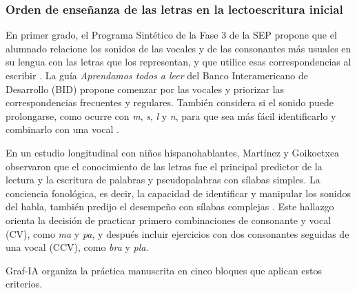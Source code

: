 \subsubsection{Orden de enseñanza de las letras en la lectoescritura inicial}
\label{sec:orden-ensenanza-letras}

En primer grado, el Programa Sintético de la Fase 3 de la SEP propone que el alumnado relacione los sonidos de las vocales y de las consonantes más usuales en su lengua con las letras que los representan, y que utilice esas correspondencias al escribir \cite{sep2024fase3}. La guía \textit{Aprendamos todos a leer} del Banco Interamericano de Desarrollo (BID) propone comenzar por las vocales y priorizar las correspondencias frecuentes y regulares. También considera si el sonido puede prolongarse, como ocurre con \textit{m}, \textit{s}, \textit{l} y \textit{n}, para que sea más fácil identificarlo y combinarlo con una vocal \cite[pp.~18--20]{bid2022aprendamos}.

En un estudio longitudinal con niños hispanohablantes, Martínez y Goikoetxea observaron que el conocimiento de las letras fue el principal predictor de la lectura y la escritura de palabras y pseudopalabras con sílabas simples. La conciencia fonológica, es decir, la capacidad de identificar y manipular los sonidos del habla, también predijo el desempeño con sílabas complejas \cite{martinez2020predictors}. Este hallazgo orienta la decisión de practicar primero combinaciones de consonante y vocal (CV), como \textit{ma} y \textit{pa}, y después incluir ejercicios con dos consonantes seguidas de una vocal (CCV), como \textit{bra} y \textit{pla}.

Graf-IA organiza la práctica manuscrita en cinco bloques que aplican estos criterios.

